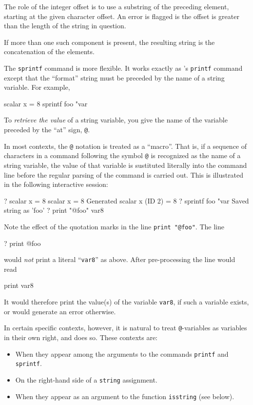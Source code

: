 The role of the integer offset is to use a substring of the preceding
element, starting at the given character offset.  An error is flagged
is the offset is greater than the length of the string in question.

If more than one such component is present, the resulting string
is the concatenation of the elements.

The \texttt{sprintf} command is more flexible.  It works exactly as
's \texttt{printf} command except that the ``format''
string must be preceded by the name of a string variable.  For
example,
%
\begin{code}
scalar x = 8
sprintf foo "var%
\end{code}

To \textit{retrieve the value} of a string variable, you give the name
of the variable preceded by the ``at'' sign, \verb|@|.  

In most contexts, the \verb|@| notation is treated as a ``macro''.
That is, if a sequence of characters in a  command
following the symbol \verb|@| is recognized as the name of a string
variable, the value of that variable is sustituted literally into the
command line before the regular parsing of the command is
carried out.  This is illustrated in the following interactive
session:
%
\begin{code}
? scalar x = 8
 scalar x = 8
Generated scalar x (ID 2) = 8
? sprintf foo "var%
Saved string as 'foo'
? print "@foo"
var8
\end{code}
%
Note the effect of the quotation marks in the line 
\verb|print "@foo"|.  The line
%
\begin{code}
? print @foo
\end{code}
%
would \textit{not} print a literal ``\texttt{var8}'' as above.  After
pre-processing the line would read
%
\begin{code}
print var8
\end{code}
%
It would therefore print the value(s) of the variable \texttt{var8},
if such a variable exists, or would generate an error otherwise.

In certain specific contexts, however, it is natural to treat
\verb|@|-variables as variables in their own right, and 
does so.  These contexts are:
\begin{itemize}
\item When they appear among the arguments to the commands \texttt{printf} and
  \texttt{sprintf}.
\item On the right-hand side of a \texttt{string} assignment.
\item When they appear as an argument to the function
  \texttt{isstring} (see below).
\end{itemize}

